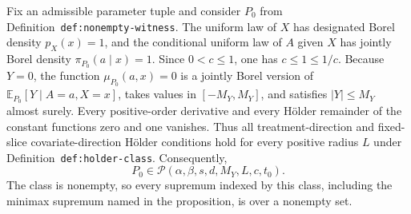 Fix an admissible parameter tuple and consider \(P_0\) from Definition~\texttt{def:nonempty-witness}. The uniform law of \(X\) has designated Borel density \(p_X(x)=1\), and the conditional uniform law of \(A\) given \(X\) has jointly Borel density \(\pi_{P_0}(a\mid x)=1\). Since \(0<c\le1\), one has \(c\le1\le1/c\). Because \(Y=0\), the function \(\mu_{P_0}(a,x)=0\) is a jointly Borel version of \(\mathbb E_{P_0}[Y\mid A=a,X=x]\), takes values in \([-M_Y,M_Y]\), and satisfies \(\lvert Y\rvert\le M_Y\) almost surely. Every positive-order derivative and every H\"older remainder of the constant functions zero and one vanishes. Thus all treatment-direction and fixed-slice covariate-direction H\"older conditions hold for every positive radius \(L\) under Definition~\texttt{def:holder-class}. Consequently,
\[
P_0\in\mathcal P(\alpha,\beta,s,d,M_Y,L,c,t_0).
\]
The class is nonempty, so every supremum indexed by this class, including the minimax supremum named in the proposition, is over a nonempty set.